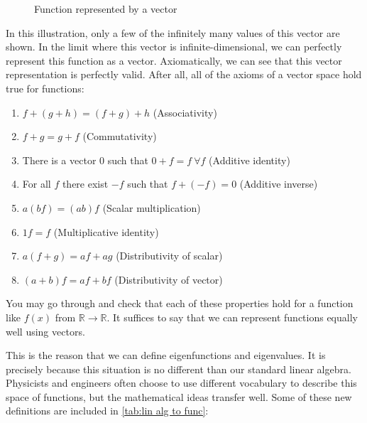 \begin{figure}[ht]

    \caption{Function represented by a vector}
    \label{fig:func as vector}
\end{figure}

In this illustration, only a few of the infinitely many values of this vector are shown. In the limit where this vector is infinite-dimensional, we can perfectly represent this function as a vector. Axiomatically, we can see that this vector representation is perfectly valid. After all, all of the axioms of a vector space hold true for functions:
\begin{enumerate}
    \item $f+(g+h)=(f+g)+h$ (Associativity)
    \item $f+g=g+f$ (Commutativity)
    \item There is a vector $0$ such that $0+f=f \ \forall f$ (Additive identity)
    \item For all $f$ there exist $-f$ such that $f+(-f)=0$ (Additive inverse)
    \item $a(bf)=(ab)f$ (Scalar multiplication)
    \item $1f=f$ (Multiplicative identity)
    \item $a(f+g)=af+ag$ (Distributivity of scalar)
    \item $(a+b)f=af+bf$ (Distributivity of vector)
\end{enumerate}
You may go through and check that each of these properties hold for a function like $f(x)$ from $\mathbb{R}\rightarrow\mathbb{R}$. It suffices to say that we can represent functions equally well using vectors. 

This is the reason that we can define \glspl{eigenfunction} and eigenvalues. It is precisely because this situation is no different than our standard linear algebra. Physicists and engineers often choose to use different vocabulary to describe this space of functions, but the mathematical ideas transfer well. Some of these new definitions are included in \autoref{tab:lin alg to func}:

